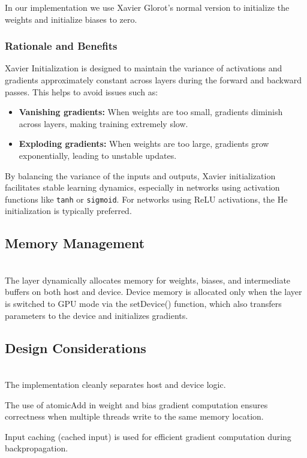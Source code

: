 In our implementation we use Xavier Glorot's normal version to initialize the weights and initialize biases to zero.

\subsubsection*{Rationale and Benefits}

Xavier Initialization is designed to maintain the variance of activations and gradients approximately constant across layers during the forward and backward passes. This helps to avoid issues such as:

\begin{itemize}
    \item \textbf{Vanishing gradients:} When weights are too small, gradients diminish across layers, making training extremely slow.
    \item \textbf{Exploding gradients:} When weights are too large, gradients grow exponentially, leading to unstable updates.
\end{itemize}

By balancing the variance of the inputs and outputs, Xavier initialization facilitates stable learning dynamics, especially in networks using activation functions like \texttt{tanh} or \texttt{sigmoid}. For networks using ReLU activations, the He initialization is typically preferred.

\subsection{Memory Management}\\
The layer dynamically allocates memory for weights, biases, and intermediate buffers on both host and device. Device memory is allocated only when the layer is switched to GPU mode via the setDevice() function, which also transfers parameters to the device and initializes gradients.

\subsection{Design Considerations}\\
The implementation cleanly separates host and device logic.

The use of atomicAdd in weight and bias gradient computation ensures correctness when multiple threads write to the same memory location.

Input caching (cached input) is used for efficient gradient computation during backpropagation.
